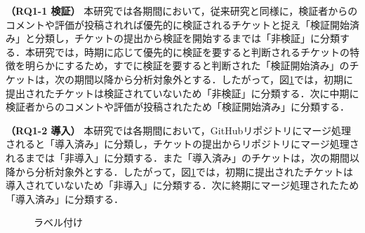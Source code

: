 \documentclass[T,J]{fose} %
\begin{document}
\textbf{（RQ1-1 検証）} 本研究では各期間において，従来研究\cite{prioritizer}と同様に，検証者からのコメントや評価が投稿されれば優先的に検証されるチケットと捉え「検証開始済み」と分類し，チケットの提出から検証を開始するまでは「非検証」に分類する．本研究では，時期に応じて優先的に検証を要すると判断されるチケットの特徴を明らかにするため，すでに検証を要すると判断された「検証開始済み」のチケットは，次の期間以降から分析対象外とする．したがって，図\ref{fig:labeling}では，初期に提出されたチケットは検証されていないため「非検証」に分類する．次に中期に検証者からのコメントや評価が投稿されたため「検証開始済み」に分類する．

\textbf{（RQ1-2 導入）} 本研究では各期間において，GitHubリポジトリにマージ処理されると「導入済み」に分類し，チケットの提出からリポジトリにマージ処理されるまでは「非導入」に分類する．また「導入済み」のチケットは，次の期間以降から分析対象外とする．したがって，図\ref{fig:labeling}では，初期に提出されたチケットは導入されていないため「非導入」に分類する．次に終期にマージ処理されたため「導入済み」に分類する．




\begin{figure}[t]
\begin{center}
\caption{ラベル付け}
\label{fig:labeling}
\end{center}
\end{figure}
\end{document}
